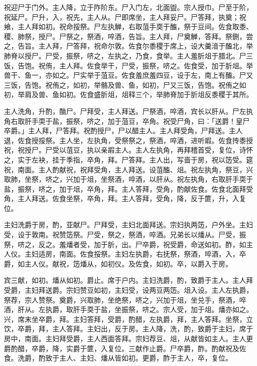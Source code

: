 \documentclass[]{article}
\begin{document}
祝迎尸于门外。主人降，立于阼阶东。尸入门左，北面盥。宗人授巾。尸至于阶，祝延尸。尸升，入，祝先，主人从。尸即席坐，主人拜妥尸。尸答拜，执奠；祝飨，主人拜如初。祝命挼祭。尸左执觯，右取菹手耎于醢，祭于豆间。佐食取黍、稷、肺祭，授尸。尸祭之，祭酒，啐酒，告旨。主人拜，尸奠觯，答拜。祭鉶，尝之，告旨。主人拜，尸答拜，祝命尔敦。佐食尔黍稷于席上，设大羹湆于醢北，举肺脊以授尸。尸受，振祭，哜之，左执之，乃食，食举。主人羞肵俎于腊北。尸三饭，告饱。祝侑，主人拜。佐食举干，尸受，振祭，哜之。佐食受，加于肵俎。举兽干、鱼一，亦如之。尸实举于菹豆。佐食羞庶羞四豆，设于左，南上有醢。尸又三饭，告饱。祝侑之，如初，举骼及兽、鱼，如初，尸又三饭，告饱。祝侑之如初，举肩及兽、鱼如初。佐食盛肵俎，俎释三个，举肺脊加于肵俎反黍稷于其所。

主人洗角，升酌，酳尸。尸拜受，主人拜送。尸祭酒，啐酒，宾长以肝从。尸左执角右取肝手耎于盐，振祭，哜之，加于菹豆，卒角。祝受尸角，曰：「送爵！皇尸卒爵。」主人拜，尸答拜。祝酌授尸，尸以醋主人。主人拜受角，尸拜送。主人退，佐食授挼祭。主人坐，左执角，受祭祭之，祭酒，啐酒，进听嘏。佐食抟黍授祝，祝授尸。尸受以菹豆，执以亲嘏主人。主人左执角，再拜稽首受，复位，诗怀之，实于左袂，挂于季指，卒角，拜。尸答拜。主人出，写啬于房，祝以笾受。筵祝，南面。主人酌献祝，祝拜受角，主人拜送。设菹醢、俎。祝左执角，祭豆，兴取肺，坐祭，哜之，兴加于俎，坐祭酒，啐酒，以肝从。祝左执角，右取肝手耎于盐，振祭，哜之，加于俎，卒角，拜。主人答拜，受角，酌献佐食。佐食北面拜受角，主人拜送。佐食坐祭，卒角，拜。主人答拜，受角，降，反于篚，升，入复位。

主妇洗爵于房，酌，亚献尸。尸拜受，主妇北面拜送。宗妇执两笾，户外坐。主妇受，设于敦南。祝赞笾祭。尸受，祭之，祭酒，啐酒。兄弟长以燔从。尸受，振祭，哜之，反之。羞燔者受，加于肵，出。尸卒爵，祝受爵，命送如初。酢，如主人仪。主妇适房，南面。佐食挼祭。主妇左执爵，右抚祭，祭酒，啐酒，入，卒爵，如主人仪。献祝，笾燔从，如初仪。及佐食，如初。卒，以爵入于房。

宾三献，如初。燔从如初。爵止。席于户内。主妇洗爵，酌，致爵于主人。主人拜受爵，主妇拜送爵。宗妇赞豆如初，主妇受，设两豆两笾。俎入设。主人左执爵，祭荐，宗人赞祭。奠爵，兴取肺，坐绝祭，哜之，兴加于俎，坐兑手，祭酒，啐酒，肝从。左执爵，取肝手耎于盐，坐振祭，哜之。宗人受，加于俎。燔亦如之。兴，席末坐卒爵，拜。主妇答拜，受爵，酌醋，左执爵，拜，主人答拜。坐祭，立饮，卒爵，拜，主人答拜。主妇出，反于房。主人降，洗，酌，致爵于主妇，席于房中，南面。主妇拜受爵，主人西面答拜。宗妇荐豆、俎，从献皆如主人。主人更爵酌醋，卒爵，降，实爵于篚，入复位。三献作止爵。尸卒爵，酢。酌献祝及佐食。洗爵，酌致于主人、主妇、燔从皆如初。更爵，酢于主人，卒，复位。
\end{document}
